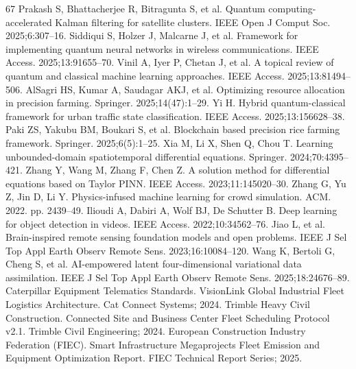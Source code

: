 \documentclass[pdflatex,sn-mathphys,Numbered]{sn-jnl}%
\begin{document}
\begin{thebibliography}{67}
 Prakash S, Bhattacherjee R, Bitragunta S, et al. Quantum computing-accelerated Kalman filtering for satellite clusters. IEEE Open J Comput Soc. 2025;6:307--16.
 Siddiqui S, Holzer J, Malcarne J, et al. Framework for implementing quantum neural networks in wireless communications. IEEE Access. 2025;13:91655--70.
 Vinil A, Iyer P, Chetan J, et al. A topical review of quantum and classical machine learning approaches. IEEE Access. 2025;13:81494--506.
 AlSagri HS, Kumar A, Saudagar AKJ, et al. Optimizing resource allocation in precision farming. Springer. 2025;14(47):1--29.
 Yi H. Hybrid quantum-classical framework for urban traffic state classification. IEEE Access. 2025;13:156628--38.
 Paki ZS, Yakubu BM, Boukari S, et al. Blockchain based precision rice farming framework. Springer. 2025;6(5):1--25.
 Xia M, Li X, Shen Q, Chou T. Learning unbounded-domain spatiotemporal differential equations. Springer. 2024;70:4395--421.
 Zhang Y, Wang M, Zhang F, Chen Z. A solution method for differential equations based on Taylor PINN. IEEE Access. 2023;11:145020--30.
 Zhang G, Yu Z, Jin D, Li Y. Physics-infused machine learning for crowd simulation. ACM. 2022. pp. 2439--49.
 Ilioudi A, Dabiri A, Wolf BJ, De Schutter B. Deep learning for object detection in videos. IEEE Access. 2022;10:34562--76.
 Jiao L, et al. Brain-inspired remote sensing foundation models and open problems. IEEE J Sel Top Appl Earth Observ Remote Sens. 2023;16:10084--120.
 Wang K, Bertoli G, Cheng S, et al. AI-empowered latent four-dimensional variational data assimilation. IEEE J Sel Top Appl Earth Observ Remote Sens. 2025;18:24676--89.
 Caterpillar Equipment Telematics Standards. VisionLink Global Industrial Fleet Logistics Architecture. Cat Connect Systems; 2024.
 Trimble Heavy Civil Construction. Connected Site and Business Center Fleet Scheduling Protocol v2.1. Trimble Civil Engineering; 2024.
 European Construction Industry Federation (FIEC). Smart Infrastructure Megaprojects Fleet Emission and Equipment Optimization Report. FIEC Technical Report Series; 2025.
\end{thebibliography}
\end{document}
